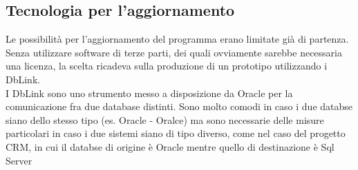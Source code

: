 \subsection{Tecnologia per l'aggiornamento}
Le possibilità per l'aggiornamento del programma erano limitate già di partenza. Senza utilizzare software di terze parti, dei quali ovviamente sarebbe necessaria una licenza, la scelta ricadeva sulla produzione di un prototipo utilizzando i DbLink.\\
I DbLink sono uno strumento messo a disposizione da Oracle per la comunicazione fra due database distinti. Sono molto comodi in caso i due databse siano dello stesso tipo (es. Oracle - Oralce) ma sono necessarie delle misure particolari in caso i due sistemi siano di tipo diverso, come nel caso del progetto CRM, in cui il databse di origine è Oracle mentre quello di destinazione è Sql Server